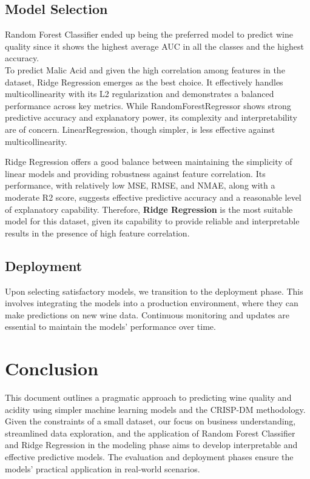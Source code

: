 \documentclass[twocolumn]{article}
\begin{document}
	\subsection{Model Selection}
    Random Forest Classifier ended up being the preferred model to predict wine quality since it shows the highest average AUC in all the classes and the highest accuracy.\\
	To predict Malic Acid and given the high correlation among features in the dataset, Ridge Regression
	emerges as the best choice. It effectively handles multicollinearity with its L2
	regularization and demonstrates a balanced performance across key metrics.
	While RandomForestRegressor shows strong predictive accuracy and explanatory
	power, its complexity and interpretability are of concern. LinearRegression, though
	simpler, is less effective against multicollinearity.

	Ridge Regression offers a good balance between maintaining the simplicity of
	linear models and providing robustness against feature correlation. Its performance,
	with relatively low MSE, RMSE, and NMAE, along with a moderate R2 score,
	suggests effective predictive accuracy and a reasonable level of explanatory
	capability. Therefore, \textbf{Ridge Regression} is the most suitable model for
	this dataset, given its capability to provide reliable and interpretable
	results in the presence of high feature correlation.

	\subsection{Deployment}
	Upon selecting satisfactory models, we transition to the deployment phase.
	This involves integrating the models into a production environment, where they
	can make predictions on new wine data. Continuous monitoring and updates are
	essential to maintain the models' performance over time.

	\section{Conclusion}
	This document outlines a pragmatic approach to predicting wine quality and acidity
	using simpler machine learning models and the CRISP-DM methodology. Given the
	constraints of a small dataset, our focus on business understanding,
	streamlined data exploration, and the application of Random Forest Classifier and
	Ridge Regression in the modeling phase aims to develop interpretable and effective
	predictive models. The evaluation and deployment phases ensure the models' practical
	application in real-world scenarios.
\end{document}
